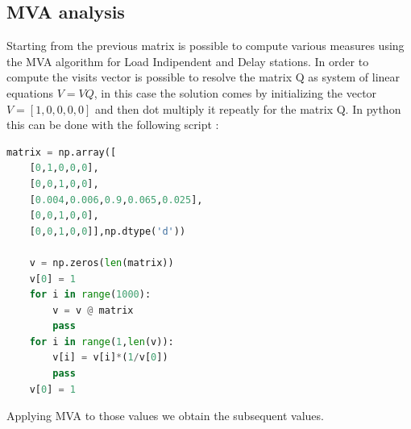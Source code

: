 \documentclass[12pt,a4paper]{article}
\begin{document}
\subsection{MVA analysis}
Starting from the previous matrix is possible to compute various measures using the MVA algorithm for Load Indipendent and Delay stations. In order to compute the visits vector is possible to resolve the matrix Q as system of linear equations $V=VQ$, in this case the solution comes by initializing the vector $V = [1,0,0,0,0]$ and then dot multiply it repeatly for the matrix Q. In python this can be done with the following script :\pagebreak
\begin{lstlisting}[language=python]
    matrix = np.array([
    [0,1,0,0,0],
    [0,0,1,0,0],
    [0.004,0.006,0.9,0.065,0.025],
    [0,0,1,0,0],
    [0,0,1,0,0]],np.dtype('d'))

    v = np.zeros(len(matrix))
    v[0] = 1
    for i in range(1000):
        v = v @ matrix
        pass
    for i in range(1,len(v)):
        v[i] = v[i]*(1/v[0])
        pass
    v[0] = 1
    \end{lstlisting}
Applying MVA to those values we obtain the subsequent values.
\end{document}
